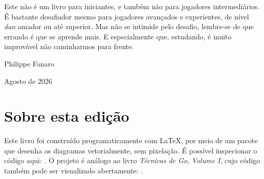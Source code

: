 Este não é um livro para iniciantes, e também não para jogadores intermediários. É bastante desafiador mesmo para jogadores avançados e experientes, de nível \textit{dan} amador ou até superior. Mas não se intimide pelo desafio, lembre-se de que errando é que se aprende mais. E especialmente que, estudando, é muito improvável não caminharmos para frente.

\bigskip
\bigskip

\hspace*{\fill} Philippe Fanaro

\hspace*{\fill} Agosto de 2026

\section*{Sobre esta edição}
{}

Este livro foi construído programaticamente com \LaTeX, por meio de um pacote que desenha os diagramas vetorialmente, sem pixelação. É possível inspecionar o código aqui: \href{https://github.com/psygo/tsumego\_workbooks}{}. O projeto é análogo ao livro \textit{Técnicas de Go}, \textit{Volume I}, cujo código também pode ser visualizado abertamente: \href{https://github.com/psygo/tecnicas\_de\_go}{}.
